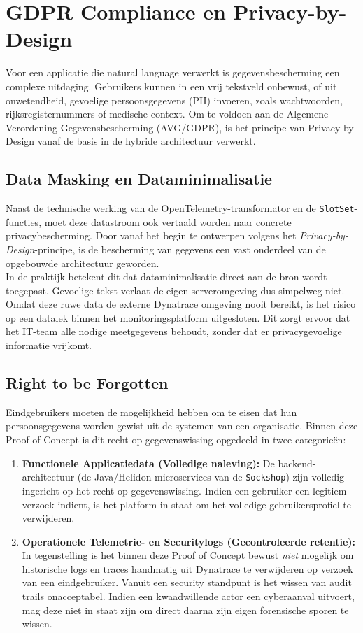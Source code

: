 \section{GDPR Compliance en Privacy-by-Design}

Voor een applicatie die natural language verwerkt is gegevensbescherming een complexe uitdaging. Gebruikers kunnen in een vrij tekstveld onbewust, of uit onwetendheid, gevoelige persoonsgegevens (PII) invoeren, zoals wachtwoorden, rijksregisternummers of medische context. Om te voldoen aan de Algemene Verordening Gegevensbescherming (AVG/GDPR), is het principe van Privacy-by-Design vanaf de basis in de hybride architectuur verwerkt.

\subsection{Data Masking en Dataminimalisatie}

Naast de technische werking van de OpenTelemetry-transformator en de \texttt{SlotSet}-functies, moet deze datastroom ook vertaald worden naar concrete privacybescherming. Door vanaf het begin te ontwerpen volgens het \textit{Privacy-by-Design}-principe, is de bescherming van gegevens een vast onderdeel van de opgebouwde architectuur geworden.\\

In de praktijk betekent dit dat dataminimalisatie direct aan de bron wordt toegepast. Gevoelige tekst verlaat de eigen serveromgeving dus simpelweg niet. Omdat deze ruwe data de externe Dynatrace omgeving nooit bereikt, is het risico op een datalek binnen het monitoringsplatform uitgesloten. Dit zorgt ervoor dat het IT-team alle nodige meetgegevens behoudt, zonder dat er privacygevoelige informatie vrijkomt.

\subsection{Right to be Forgotten}

Eindgebruikers moeten de mogelijkheid hebben om te eisen dat hun persoonsgegevens worden gewist uit de systemen van een organisatie. Binnen deze Proof of Concept is dit recht op gegevenswissing opgedeeld in twee categorieën:

\begin{enumerate}
    \item \textbf{Functionele Applicatiedata (Volledige naleving):} De backend-architectuur (de Java/Helidon microservices van de \texttt{Sockshop}) zijn volledig ingericht op het recht op gegevenswissing. Indien een gebruiker een legitiem verzoek indient, is het platform in staat om het volledige gebruikersprofiel te verwijderen.
    \item \textbf{Operationele Telemetrie- en Securitylogs (Gecontroleerde retentie):} In tegenstelling is het binnen deze Proof of Concept bewust \textit{niet} mogelijk om historische logs en traces handmatig uit Dynatrace te verwijderen op verzoek van een eindgebruiker. Vanuit een security standpunt is het wissen van audit trails onacceptabel. Indien een kwaadwillende actor een cyberaanval uitvoert, mag deze niet in staat zijn om direct daarna zijn eigen forensische sporen te wissen. 
\end{enumerate}

